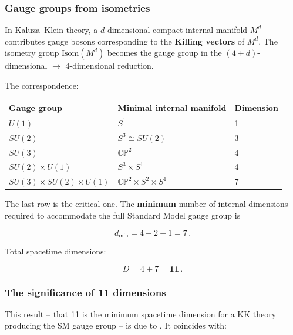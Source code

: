 \documentclass[aps,prd,preprint,superscriptaddress,longbibliography,floatfix]{revtex4-2}
\theoremstyle{remark}
\begin{document}
\subsubsection{Gauge groups from isometries}

In Kaluza--Klein theory, a $d$-dimensional compact internal manifold $M^d$ contributes gauge bosons corresponding to the \textbf{Killing vectors} of $M^d$. The isometry group $\text{Isom}(M^d)$ becomes the gauge group in the $(4+d)$-dimensional $\to$ 4-dimensional reduction.

The correspondence:


\begin{table}[H]
\begin{ruledtabular}
\begin{tabular}{p{5.0cm}p{5.0cm}p{5.0cm}}
Gauge group & Minimal internal manifold & Dimension \\
\hline
$U(1)$ & $S^1$ & 1 \\
$SU(2)$ & $S^3 \cong SU(2)$ & 3 \\
$SU(3)$ & $\mathbb{CP}^2$ & 4 \\
$SU(2) \times U(1)$ & $S^3 \times S^1$ & 4 \\
$SU(3) \times SU(2) \times U(1)$ & $\mathbb{CP}^2 \times S^2 \times S^1$ & 7 \\
\end{tabular}
\end{ruledtabular}
\end{table}

The last row is the critical one. The \textbf{minimum} number of internal dimensions required to accommodate the full Standard Model gauge group is


\begin{equation}
    d_{\text{min}} = 4 + 2 + 1 = 7 \,.
\end{equation}

Total spacetime dimensions:


\begin{equation}
    D = 4 + 7 = \mathbf{11} \,.
\end{equation}


\subsubsection{The significance of 11 dimensions}

This result -- that 11 is the minimum spacetime dimension for a KK theory producing the SM gauge group -- is due to \cite{Witten1981}. It coincides with:
\end{document}
